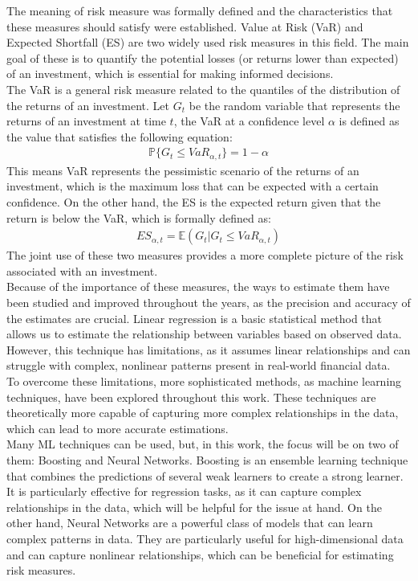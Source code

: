\documentclass[11pt]{book}
\theoremstyle{plain} %
\theoremstyle{definition} %
\begin{document}
The meaning of risk measure was formally defined and the 
characteristics that these measures should satisfy were established.
Value at Risk (VaR) and Expected Shortfall (ES) are two widely 
used risk measures in this field. The main goal of these is 
to quantify the potential losses (or returns lower than expected) of 
an investment, which is essential for making informed 
decisions. \\

The VaR is a general risk measure related to the quantiles of the 
distribution of the returns of an investment. Let $G_t$ be the random variable 
that represents the returns of an investment at time $t$, the VaR at a 
confidence level $\alpha$ is defined as the value that satisfies the following 
equation:
\begin{align*}
   \mathbb{P}\{G_t \leq VaR_{\alpha, t}\} = 1-\alpha
\end{align*}
This means VaR represents the pessimistic scenario of the returns of an
investment, which is the maximum loss that can be expected with a certain 
confidence. On the other hand, the ES is the expected 
return given that the return is below the VaR, which is formally defined 
as:
\begin{align*}
   ES_{\alpha, t} = \mathbb{E}(G_t|G_t \leq VaR_{\alpha, t})
\end{align*}
The joint use of these two measures provides a more complete 
picture of the risk associated with an investment. \\

Because of the importance of these measures, the ways to estimate them 
have been studied and improved throughout the years, as the 
precision and accuracy of the estimates are crucial. Linear regression 
is a basic statistical method that allows us to estimate the relationship between variables based on observed data. However, this technique has limitations, as it assumes 
linear relationships and can struggle with complex, nonlinear patterns 
present in real-world financial data.\\

To overcome these limitations, more sophisticated methods, as machine 
learning techniques, have been explored throughout this work. These 
techniques are theoretically more capable of capturing more complex 
relationships in the data, which can lead to more accurate estimations. \\

Many ML techniques can be used, but, in this work, the focus will be on 
two of them: Boosting and Neural Networks. Boosting is an 
ensemble learning technique that combines the predictions of several
weak learners to create a strong learner. It is particularly effective for
regression tasks, as it can capture complex relationships in the data, which 
will be helpful for the issue at hand. On the other hand, Neural Networks are
a powerful class of models that can learn complex patterns in data.
They are particularly useful for high-dimensional data and can capture
nonlinear relationships, which can be beneficial for estimating risk measures.\\
\end{document}

